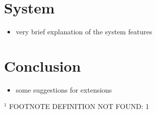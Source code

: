 \documentclass[11pt]{article}
\begin{document}
\section{System}
\label{sec-6}

\begin{itemize}
\item very brief explanation of the system features
\end{itemize}
\section{Conclusion}
\label{sec-7}

\begin{itemize}
\item some suggestions for extensions
    \printbibliography
\end{itemize}
$^{1}$ FOOTNOTE DEFINITION NOT FOUND: 1
\end{document}
